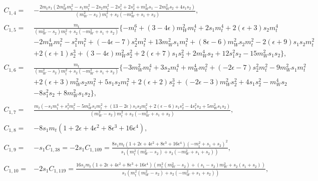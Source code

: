 \documentclass[twocolumn,aps,showpacs,nofootinbib,superscriptaddress,prd]{revtex4-2}
\begin{document}
\begin{widetext}
\begin{align}
C_{1,4}=&-\frac{2m_ts_1\left(2m_W^2m_t^2-s_1m_t^2-2s_2m_t^2-2s_1^2+2s_2^2+m_W^2s_1-2m_W^2s_2+4s_1s_2\right)}{\left(m_W^2-s_2\right)m_t^2+s_2\left(-m_W^2+s_1+s_2\right)}
,\nonumber\\
\nonumber\\
C_{1,5}=&\frac{m_t}{\left(m_W^2-s_2\right)m_t^2+s_2\left(-m_W^2+s_1+s_2\right)}\{-m_t^6+\left(3-4\epsilon\right)m_W^2m_t^4+2s_1m_t^4+2\left(\epsilon+3\right)s_2m_t^4
\nonumber\\&
-2m_W^4m_t^2-s_1^2m_t^2+\left(-4\epsilon-7\right)s_2^2m_t^2+13m_W^2s_1m_t^2+\left(8\epsilon-6\right)m_W^2s_2m_t^2-2\left(\epsilon+9\right)s_1s_2m_t^2
\nonumber\\&
+2\left(\epsilon+1\right)s_2^3+\left(3-4\epsilon\right)m_W^2s_2^2+2\left(\epsilon+7\right)s_1s_2^2+2m_W^4s_2+12s_1^2s_2-15m_W^2s_1s_2\}
,\nonumber\\
\nonumber\\
C_{1,6}=&\frac{m_t}{\left(m_W^2-s_2\right)m_t^2+s_2\left(-m_W^2+s_1+s_2\right)}\{-3m_W^2m_t^4+3s_2m_t^4+m_W^4m_t^2+\left(-2\epsilon-7\right)s_2^2m_t^2-9m_W^2s_1m_t^2
\nonumber\\&
+2\left(\epsilon+3\right)m_W^2s_2m_t^2+5s_1s_2m_t^2+2\left(\epsilon+2\right)s_2^3+\left(-2\epsilon-3\right)m_W^2s_2^2+4s_1s_2^2-m_W^4s_2
\nonumber\\&
-8s_1^2s_2+8m_W^2s_1s_2\}
,\nonumber\\
\nonumber\\
C_{1,7}=&\frac{m_t(-s_1m_t^4+s_1^2m_t^2-5m_W^2s_1m_t^2+(13-2\epsilon)s_1s_2m_t^2+2(\epsilon-6)s_1s_2^2-4s_1^2s_2+5m_W^2s_1s_2)}{\left(m_W^2-s_2\right)m_t^2+s_2\left(-m_W^2+s_1+s_2\right)}
,\nonumber\\
\nonumber\\
C_{1,8}=&-8s_1m_t\left(1 +2 \epsilon +4 \epsilon^2 +8 \epsilon^3 +16 \epsilon^4\right)
,\nonumber\\
\nonumber\\
C_{1,9}=&-s_1C_{1,38}=-2s_1C_{1,109}=\frac{8s_1m_t\left(1 +2 \epsilon +4 \epsilon^2 +8 \epsilon^3 +16 \epsilon^4\right)\left(-m_t^2+s_1+s_2\right)^2}{s_1\left(m_t^2
\left(m_W^2-s_2\right)+s_2\left(-m_W^2+s_1+s_2\right)\right)}
,\nonumber\\
\nonumber\\
C_{1,10}=&-2s_1C_{1,119}=\frac{16s_1m_t\left(1 +2 \epsilon +4 \epsilon^2 +8 \epsilon^3 +16 \epsilon^4\right)\left(m_t^2
\left(m_W^2-s_2\right)+\left(s_1-s_2\right)m_W^2+s_2\left(s_1+s_2\right)\right)}{s_1\left(m_t^2\left(m_W^2-s_2\right)+s_2
\left(-m_W^2+s_1+s_2\right)\right)}
,\nonumber\\

\end{align}
\end{widetext}
\end{document}

